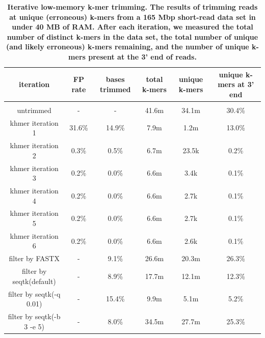 \documentclass[10pt]{article}
\begin{document}
\begin{table}[!ht]
\caption{
\bf{Iterative low-memory k-mer trimming.  The results of trimming
  reads at unique (erroneous) k-mers from a 165 Mbp short-read data
  set in under 40 MB of RAM.  After each iteration, we measured the
  total number of distinct k-mers in the data set, the total number
  of unique (and likely erroneous) k-mers remaining, and the
  number of unique k-mers present at the 3' end of reads.}}
\begin{tabular}{ | c | c | c | c | c | c |}
iteration & FP rate & bases trimmed & total k-mers & unique k-mers & 
unique k-mers at 3' end \\
\hline \\
untrimmed                           &      -  &      - & 41.6m & 34.1m & 30.4\%  \\
khmer iteration 1                   & 31.6\%  & 14.9\% &  7.9m &  1.2m & 13.0\% \\
khmer iteration 2                   &  0.3\%  &  0.5\% &  6.7m & 23.5k &  0.2\% \\
khmer iteration 3                   &  0.2\%  &  0.0\% &  6.6m &  3.4k &  0.1\% \\
khmer iteration 4                   &  0.2\%  &  0.0\% &  6.6m &  2.7k &  0.1\% \\
khmer iteration 5                   &  0.2\%  &  0.0\% &  6.6m &  2.7k &  0.1\% \\
khmer iteration 6                   &  0.2\%  &  0.0\% &  6.6m &  2.6k &  0.1\% \\
filter by FASTX                     &      -  &  9.1\% & 26.6m & 20.3m & 26.3\% \\
filter by seqtk(default)            &      -  &  8.9\% & 17.7m & 12.1m & 12.3\% \\
filter by seqtk(-q 0.01)            &      -  & 15.4\% &  9.9m &  5.1m &  5.2\% \\
filter by seqtk(-b 3 -e 5)          &      -  &  8.0\% & 34.5m & 27.7m & 25.3\% \\
\end{tabular}
\begin{flushleft}
\end{flushleft}
\label{table:loop_trim}
\end{table}


\end{document}
